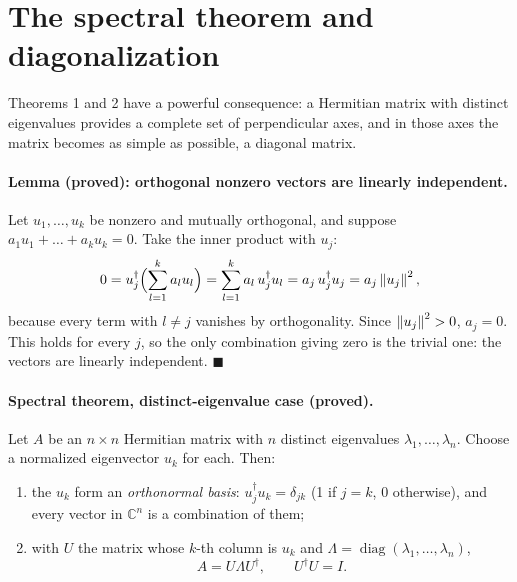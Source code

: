 \section{The spectral theorem and diagonalization}\label{sec:eigen-spectral}

Theorems 1 and 2 have a powerful consequence: a Hermitian matrix with distinct eigenvalues provides a complete set of perpendicular axes, and in those axes the matrix becomes as simple as possible, a diagonal matrix.

\paragraph{Lemma (proved): orthogonal nonzero vectors are linearly independent.} Let $u_1,\dots,u_k$ be nonzero and mutually orthogonal, and suppose $a_1u_1+\dots+a_ku_k=0$. Take the inner product with $u_j$:
\begin{equation}
0=u_j^\dagger\Bigl(\sum_{l=1}^k a_lu_l\Bigr)=\sum_{l=1}^k a_l\,u_j^\dagger u_l=a_j\,u_j^\dagger u_j=a_j\left\lVert u_j\right\rVert^2,
\end{equation}
because every term with $l\ne j$ vanishes by orthogonality. Since $\left\lVert u_j\right\rVert^2>0$, $a_j=0$. This holds for every $j$, so the only combination giving zero is the trivial one: the vectors are linearly independent. $\blacksquare$

\paragraph{Spectral theorem, distinct-eigenvalue case (proved).} Let $A$ be an $n\times n$ Hermitian matrix with $n$ distinct eigenvalues $\lambda_1,\dots,\lambda_n$. Choose a normalized eigenvector $u_k$ for each. Then:
\begin{enumerate}
\item the $u_k$ form an \emph{orthonormal basis}: $u_j^\dagger u_k=\delta_{jk}$ (1 if $j=k$, 0 otherwise), and every vector in $\mathbb{C}^n$ is a combination of them;
\item with $U$ the matrix whose $k$-th column is $u_k$ and $\Lambda=\operatorname{diag}(\lambda_1,\dots,\lambda_n)$,
\begin{equation}
\boxed{A=U\Lambda U^\dagger,\qquad U^\dagger U=I.}
\label{eq:eigen-spectral}
\end{equation}
\end{enumerate}

